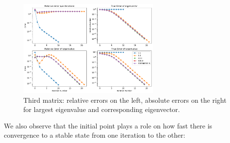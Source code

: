 \documentclass[12pt,twoside]{article}
\begin{document}
\begin{enumerate}
\begin{enumerate}
\begin{figure}[H]
	\centering
	\includegraphics[width=200pt]{figures/random_init_4.pdf}
	\caption{Third matrix: relative errors on the left,  absolute errors on the right for largest eigenvalue and corresponding eigenvector.}
	\label{fig1}
\end{figure}

We also observe that the initial point plays a role on how fast there is convergence to a stable state from one iteration to the other:

\end{enumerate}

\end{enumerate}
\end{document}

